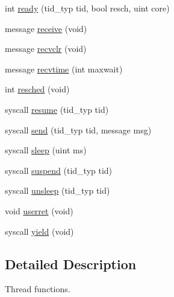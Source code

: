 \begin{DoxyCompactItemize}
\item 
int \hyperlink{group__threads_ga27672998ad7f482c641123e2c09ce279}{ready} (tid\-\_\-typ tid, bool resch, uint core)
\item 
message \hyperlink{group__threads_gab8c6462cae122b52c45f94ccdcab216a}{receive} (void)
\item 
message \hyperlink{group__threads_ga246edc36f1a948322e6ef03630db6cf6}{recvclr} (void)
\item 
message \hyperlink{group__threads_gac167f15803970d10e6d5933a497f22e3}{recvtime} (int maxwait)
\item 
int \hyperlink{group__threads_ga2f2f306789c627d026ab97132160e37b}{resched} (void)
\item 
syscall \hyperlink{group__threads_gae74ef700d7d05933c374d5115fcc81d4}{resume} (tid\-\_\-typ tid)
\item 
syscall \hyperlink{group__threads_ga5174e528e5a2f3b426bf2e6b3eb83ca2}{send} (tid\-\_\-typ tid, message msg)
\item 
syscall \hyperlink{group__threads_ga7ca76dbbaaa6e8bb9b2ec2437e3cd9bb}{sleep} (uint ms)
\item 
syscall \hyperlink{group__threads_gad28b9186e53041d8154e5f51d989a9fa}{suspend} (tid\-\_\-typ tid)
\item 
syscall \hyperlink{group__threads_ga9ba450bf776fe6c9af43757a3e93a9fc}{unsleep} (tid\-\_\-typ tid)
\item 
void \hyperlink{group__threads_gafd2dbc8bba51fd7dce39d0dc189a93f0}{userret} (void)
\item 
syscall \hyperlink{group__threads_gaacc998b2f45d9a7a067e6511dc1dbbe3}{yield} (void)
\end{DoxyCompactItemize}


\subsection{Detailed Description}
Thread functions. 

